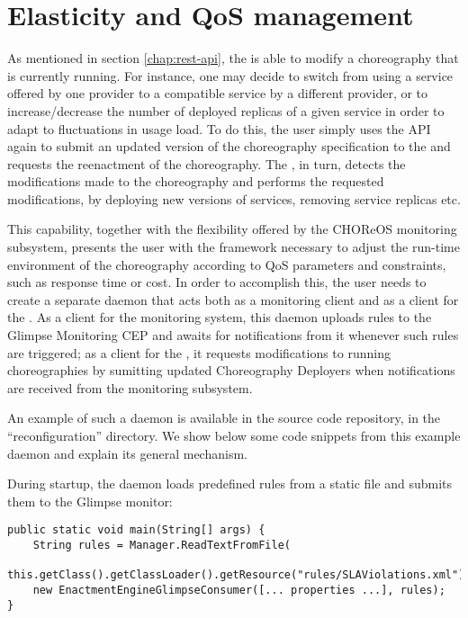 \chapter{Elasticity and QoS management}

As mentioned in section \ref{chap:rest-api}, the \ee is able to modify a
choreography that is currently running.
%
For instance, one may decide to switch from using a service offered by one
provider to a compatible service by a different provider, or to
increase/decrease the number of deployed replicas of a given service in order
to adapt to fluctuations in usage load.
%
To do this, the user simply uses the API again to submit an updated version of the
choreography specification to the \ee and requests the reenactment of the
choreography.
%
The \ee, in turn, detects the modifications made to the choreography and
performs the requested modifications, by deploying new versions of services,
removing service replicas etc.

This capability, together with the flexibility offered by the CHOReOS
monitoring subsystem, presents the user with the framework necessary to adjust
the run-time environment of the choreography according to QoS parameters and
constraints, such as response time or cost.
%
In order to accomplish this, the user needs to create a separate daemon that
acts both as a monitoring client and as a client for the \ee.
%
As a client for the monitoring system, this daemon uploads rules to the
Glimpse Monitoring CEP and awaits for notifications from it whenever such
rules are triggered;
%
as a client for the \ee, it requests modifications to running choreographies
by sumitting updated Choreography Deployers when notifications are received
from the monitoring subsystem.

An example of such a daemon is available in the \ee source code repository,
in the ``reconfiguration'' directory. We show below some code snippets from
this example daemon and explain its general mechanism.

During startup, the daemon loads predefined rules from a static file and
submits them to the Glimpse monitor:

\begin{verbatim}
public static void main(String[] args) {
    String rules = Manager.ReadTextFromFile(
        this.getClass().getClassLoader().getResource("rules/SLAViolations.xml").getFile());
    new EnactmentEngineGlimpseConsumer([... properties ...], rules);
}
\end{verbatim}

